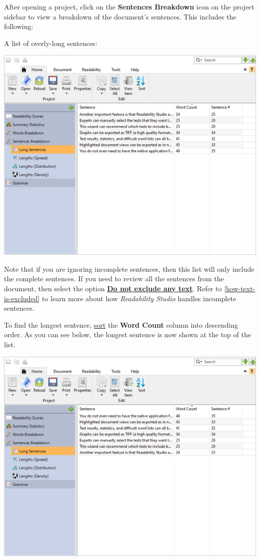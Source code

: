 \documentclass[
]{book}
\theoremstyle{definition}
\theoremstyle{definition}
\theoremstyle{definition}
\theoremstyle{definition}
\theoremstyle{remark}
\begin{document}
After opening a project, click on the \textbf{Sentences Breakdown} icon on the project sidebar to view a breakdown of the document's sentences. This includes the following:

A list of overly-long sentences:

\includegraphics{Images/featuressentencelist.png}

Note that if you are ignoring incomplete sentences, then this list will only include the complete sentences. If you need to review all the sentences from the document, then select the option \protect\hyperlink{options-text-exclusion}{\textbf{Do not exclude any text}}. Refer to \ref{how-text-is-excluded} to learn more about how \emph{Readability Studio} handles incomplete sentences.

To find the longest sentence, \protect\hyperlink{column-sorting}{sort} the \textbf{Word Count} column into descending order. As you can see below, the longest sentence is now shown at the top of the list.

\includegraphics{Images/featuressentencelistsorted.png}
\end{document}
